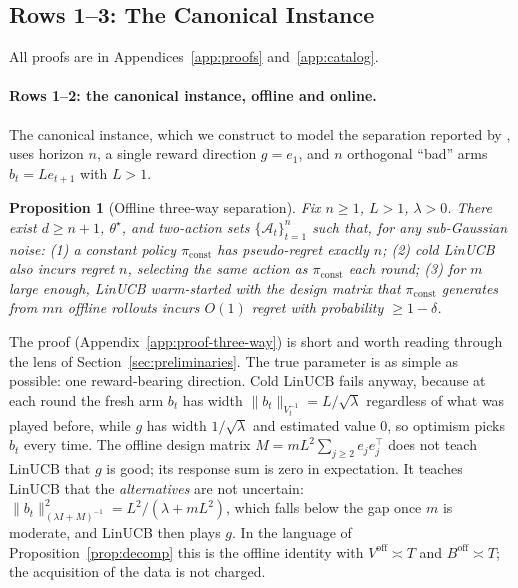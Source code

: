 \documentclass{article}
\newtheorem{proposition}{Proposition}
\theoremstyle{definition}
\theoremstyle{remark}
\theoremstyle{remark}
\begin{document}
\subsection{Rows 1--3: The Canonical Instance}
\label{sec:canonical}

All proofs are in Appendices~\ref{app:proofs} and~\ref{app:catalog}.


\paragraph{Rows 1--2: the canonical instance, offline and online.}
The canonical instance, which we construct to model the separation reported
by \cite{chen2024llmdecision}, uses
horizon $n$, a single reward direction $g=e_1$, and $n$ orthogonal ``bad''
arms $b_t=Le_{t+1}$ with $L>1$.

\begin{proposition}[Offline three-way separation]
\label{prop:three-way}
Fix $n\ge1$, $L>1$, $\lambda>0$. There exist $d\ge n+1$, $\theta^\star$, and
two-action sets $\{\mathcal A_t\}_{t=1}^n$ such that, for any sub-Gaussian
noise: (1) a constant policy $\pi_{\mathrm{const}}$ has pseudo-regret exactly
$n$; (2) cold LinUCB also incurs regret $n$, selecting the same action as
$\pi_{\mathrm{const}}$ each round; (3) for $m$ large enough, LinUCB
warm-started with the design matrix that $\pi_{\mathrm{const}}$ generates from
$mn$ \emph{offline} rollouts incurs $O(1)$ regret with probability $\ge1-\delta$.
\end{proposition}

The proof (Appendix~\ref{app:proof-three-way}) is short and worth reading
through the lens of Section~\ref{sec:preliminaries}. The true parameter is as
simple as possible: one reward-bearing direction. Cold LinUCB fails anyway,
because at each round the fresh arm $b_t$ has width $\|b_t\|_{V_t^{-1}}=L/\sqrt\lambda$
regardless of what was played before, while $g$ has width $1/\sqrt\lambda$ and
estimated value $0$, so optimism picks $b_t$ every time. The offline design
matrix $M=mL^2\sum_{j\ge2}e_je_j^\top$ does not teach LinUCB that $g$ is good;
its response sum is zero in expectation. It teaches LinUCB that the
\emph{alternatives} are not uncertain: $\|b_t\|^2_{(\lambda I+M)^{-1}}=L^2/(\lambda+mL^2)$,
which falls below the gap once $m$ is moderate, and LinUCB then plays $g$.
In the language of Proposition~\ref{prop:decomp} this is the offline identity with
$V^{\mathrm{off}}\asymp T$ and $B^{\mathrm{off}}\asymp T$; the acquisition of
the data is not charged.
\end{document}
